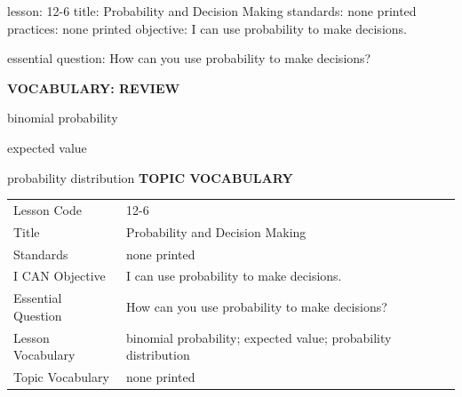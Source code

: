 \documentclass{article}
\newenvironment{lesson-meta}{}{}        %
\newcommand{\te}[1]{}                   %
\begin{document}
\begin{lesson-meta}
lesson: 12-6
title: Probability and Decision Making
standards: none printed
practices: none printed
objective: I can use probability to make decisions.

essential question: How can you use probability to make decisions?

\textbf{VOCABULARY: REVIEW}
\item binomial probability
\item expected value
\item probability distribution
\textbf{TOPIC VOCABULARY}
\te{No separate topic vocabulary list is printed on these pages.}
\begin{tabular}{ll}
Lesson Code & 12-6 \\
Title & Probability and Decision Making \\
Standards & none printed \\
I CAN Objective & I can use probability to make decisions. \\
Essential Question & How can you use probability to make decisions? \\
Lesson Vocabulary & binomial probability; expected value; probability distribution \\
Topic Vocabulary & none printed \\
\end{tabular}
\end{lesson-meta}
\end{document}
